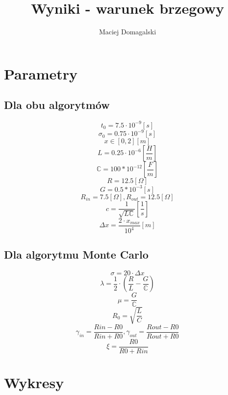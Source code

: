 \documentclass[11pt,a4paper]{report}
\author{Maciej Domagalski}
\title{Wyniki - warunek brzegowy}
\begin{document}
\chapter{Parametry}
\section{Dla obu algorytmów}
$$ t_0 = 7.5 \cdot 10^{-9}[s] $$
$$ \sigma_0 = 0.75 \cdot 10^{-9}[s] $$
$$ x \in [0, 2][m] $$
$$ L = 0.25 \cdot 10^{-6} \left[\frac{H}{m}\right] $$
$$ \mathbb{C} = 100 * 10^{-12}\left[\frac{F}{m}\right] $$
$$ R = 12.5[\Omega] $$
$$ G = 0.5 * 10^{-3}[s] $$
$$ R_{in} = 7.5[\Omega], R_{out} = 12.5[\Omega] $$
$$ c = \frac{1}{\sqrt{L \mathbb{C}}} \left[\frac{1}{s}\right] $$ 
$$ \Delta x = \frac{2 \cdot x_{max}}{10^4}[m] $$

\section{Dla algorytmu Monte Carlo}
$$ \sigma = 20 \cdot \Delta x $$
$$ \lambda = \frac{1}{2} \cdot \left( \frac{R}{L} - \frac{G}{\mathbb{C}} \right) $$ 
$$ \mu = \frac{G}{\mathbb{C}} $$
$$ R_0 = \sqrt{\frac{L}{C}} $$
$$ \gamma_{in} = \frac {Rin - R0} {Rin + R0}, \gamma_{out} = \frac {Rout - R0} {Rout + R0}  $$
$$ \xi = \frac {R0} {R0 + Rin} $$
\newpage

\chapter{Wykresy}
\end{document}

